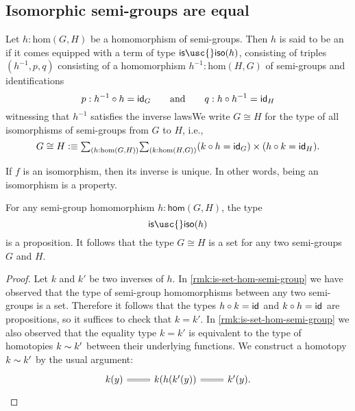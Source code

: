 \subsection{Isomorphic semi-groups are equal}

\begin{defn}
Let $h:\mathrm{hom}(G,H)$ be a homomorphism of semi-groups. Then $h$ is said to be an  if it comes equipped with a term of type $\mathsf{is\usc{}iso}(h)$, consisting of triples $(h^{-1},p,q)$ consisting of a homomorphism $h^{-1}:\mathrm{hom}(H,G)$ of semi-groups and identifications
\begin{equation*}
p:h^{-1}\circ h=\idfunc[G]\qquad\text{and}\qquad q:h\circ h^{-1}=\idfunc[H]
\end{equation*}
witnessing that $h^{-1}$ satisfies the inverse lawsWe write $G\cong H$ for the type of all isomorphisms of semi-groups from $G$ to $H$, i.e.,
\begin{equation*}
G\cong H \defeq \sm{h:\mathrm{hom}(G,H)}{k:\mathrm{hom}(H,G)} (k\circ h = \idfunc[G])\times (h\circ k=\idfunc[H]).
\end{equation*}
\end{defn}

If $f$ is an isomorphism, then its inverse is unique. In other words, being an isomorphism is a property.

\begin{lem}
  For any semi-group homomorphism $h:\mathsf{hom}(G,H)$, the type
  \begin{equation*}
    \mathsf{is\usc{}iso}(h)
  \end{equation*}
  is a proposition. It follows that the type $G\cong H$ is a set for any two semi-groups $G$ and $H$.
\end{lem}

\begin{proof}
  Let $k$ and $k'$ be two inverses of $h$. In \cref{rmk:is-set-hom-semi-group} we have observed that the type of semi-group homomorphisms between any two semi-groups is a set. Therefore it follows that the types $h\circ k=\idfunc$ and $k\circ h=\idfunc$ are propositions, so it suffices to check that $k=k'$. In \cref{rmk:is-set-hom-semi-group} we also observed that the equality type $k=k'$ is equivalent to the type of homotopies $k\htpy k'$ between their underlying functions. We construct a homotopy $k\htpy k'$ by the usual argument:
  \begin{equation*}
    \begin{tikzcd}
      k(y) \arrow[r,equals] & k(h(k'(y)) \arrow[r,equals] & k'(y).
    \end{tikzcd}\qedhere
  \end{equation*}
\end{proof}

